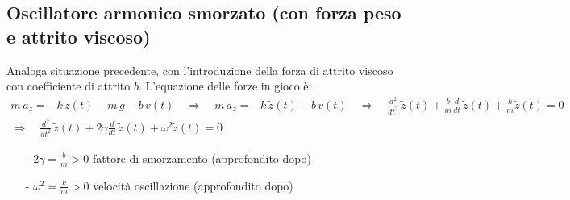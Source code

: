 \documentclass[a4paper]{article}
\newcommand\dt{\frac{d}{dt}\,}
\newcommand\dts{\frac{d^2}{dt^2}\,}
\begin{document}
\newpage

\subsection{Oscillatore armonico smorzato (con forza peso e attrito viscoso)}
Analoga situazione precedente, con l'introduzione della forza di attrito viscoso con coefficiente di attrito \(b\). L'equazione
delle forze in gioco è:
\begin{multline*}
	m \, a_z = -k \, z(t) - m \, g - b \, v(t) \quad \Rightarrow \quad m \, a_z = -k \, \tilde{z}(t) - b \, v(t) \quad \Rightarrow \quad \dts \tilde{z}(t) + \frac{b}{m} \dt \tilde{z}(t) + \frac{k}{m} \tilde{z}(t) = 0 \\
	\Rightarrow \quad \dts \tilde{z}(t) + 2 \gamma \dt \tilde{z}(t) + \omega^2 \tilde{z}(t) = 0
\end{multline*}
\begin{itemize}[topsep=3pt, itemsep=0pt]
	\item[-] \(\displaystyle 2 \gamma = \frac{b}{m} > 0\) fattore di smorzamento (approfondito dopo)
	\item[-] \(\displaystyle \omega^2 = \frac{k}{m} > 0\) velocità oscillazione (approfondito dopo)
\end{itemize}
\end{document}
